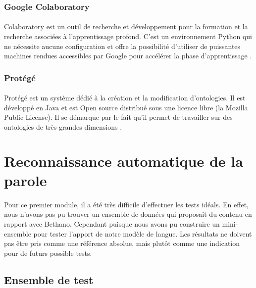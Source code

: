		\subsubsection*{Google Colaboratory}
		\paragraph{}
		Colaboratory est un outil de recherche et développement pour la formation et la recherche associées à l'apprentissage profond. C'est un environnement Python qui ne nécessite aucune configuration et offre la possibilité d'utiliser de puissantes machines rendues accessibles par Google pour accélérer la phase d'apprentissage \cite{colab}.
		
		\subsubsection*{Protégé}
		\paragraph{}
		Protégé est un système dédié à la création et la modification d'ontologies. Il est développé en Java et est Open source distribué sous une licence libre (la Mozilla Public License). Il se démarque par le fait qu'il permet de travailler sur des ontologies de très grandes dimensions 
		\cite{protege}.
		
		
\section{Reconnaissance automatique de la parole}
\paragraph{}
Pour ce premier module, il a été très difficile d'effectuer les tests idéals. En effet, nous n'avons pas pu trouver un ensemble de données qui proposait du contenu en rapport avec Bethano. Cependant puisque nous avons pu construire un mini-ensemble pour tester l'apport de notre modèle de langue. Les résultats ne doivent pas être pris comme une référence absolue, mais plutôt comme une indication pour de futurs possible tests.
	\subsection{Ensemble de test}
